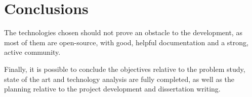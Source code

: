 \chapter{Conclusions}\label{chap:conclusions}


The technologies chosen should not prove an obstacle to the development, as most of them are open-source, with good, helpful documentation and a strong, active community.


Finally, it is possible to conclude the objectives relative to the problem study, state of the art and technology analysis are fully completed, as well as the planning relative to the project development and dissertation writing.


